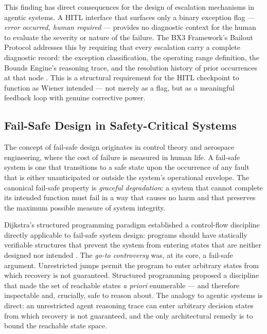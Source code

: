 This finding has direct consequences for the design of escalation mechanisms in agentic systems. A HITL interface that surfaces only a binary exception flag --- \emph{error occurred, human required} --- provides no diagnostic context for the human to evaluate the severity or nature of the failure. The BX3 Framework's Bailout Protocol addresses this by requiring that every escalation carry a complete diagnostic record: the exception classification, the operating range definition, the Bounds Engine's reasoning trace, and the resolution history of prior occurrences at that node \cite{bailoutprotocol2026}. This is a structural requirement for the HITL checkpoint to function as Wiener intended --- not merely as a flag, but as a meaningful feedback loop with genuine corrective power.


\subsection{Fail-Safe Design in Safety-Critical Systems}

The concept of fail-safe design originates in control theory and aerospace engineering, where the cost of failure is measured in human life. A fail-safe system is one that transitions to a safe state upon the occurrence of any fault that is either unanticipated or outside the system's operational envelope. The canonical fail-safe property is \emph{graceful degradation}: a system that cannot complete its intended function must fail in a way that causes no harm and that preserves the maximum possible measure of system integrity.

Dijkstra's structured programming paradigm established a control-flow discipline directly applicable to fail-safe system design: programs should have statically verifiable structures that prevent the system from entering states that are neither designed nor intended \cite{dijkstra1982}. The \emph{go-to controversy} was, at its core, a fail-safe argument. Unrestricted jumps permit the program to enter arbitrary states from which recovery is not guaranteed. Structured programming proposed a discipline that made the set of reachable states \emph{a priori} enumerable --- and therefore inspectable and, crucially, safe to reason about. The analogy to agentic systems is direct: an unrestricted agent reasoning trace can enter arbitrary decision states from which recovery is not guaranteed, and the only architectural remedy is to bound the reachable state space.

